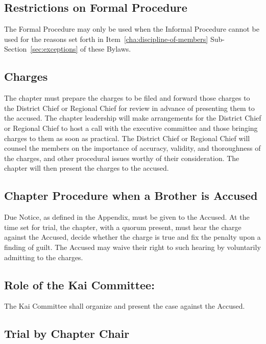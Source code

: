 \subsection{Restrictions on Formal Procedure}

The Formal Procedure may only be used when the Informal Procedure cannot be
used for the reasons set forth in Item~\ref{cha:discipline-of-members}
Sub-Section~\ref{sec:exceptions} of these Bylaws.

\subsection{Charges}

The chapter must prepare the charges to be filed and forward those charges to
the District Chief or Regional Chief for review in advance of presenting them
to the accused.
The chapter leadership will make arrangements for the District Chief or
Regional Chief to host a call with the executive committee and those bringing
charges to them as soon as practical.
The District Chief or Regional Chief will counsel the members on the importance
of accuracy, validity, and thoroughness of the charges, and other procedural
issues worthy of their consideration.
The chapter will then present the charges to the accused.

\subsection{Chapter Procedure when a Brother is Accused}

Due Notice, as defined in the Appendix, must be given to the Accused.
At the time set for trial, the chapter, with a quorum present, must hear the
charge against the Accused, decide whether the charge is true and fix the
penalty upon a finding of guilt.
The Accused may waive their right to such hearing by voluntarily admitting to
the charges.

\subsection{Role of the Kai Committee:} %

The Kai Committee shall organize and present the case against the Accused.

\subsection{Trial by Chapter Chair}

